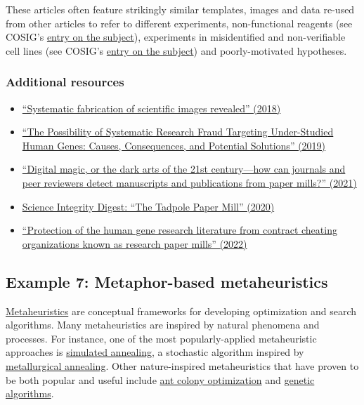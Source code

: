 \documentclass[letterpaper, 12pt]{article}
\begin{document}
These articles often feature strikingly similar templates, images and data re-used from other articles to refer to different experiments, non-functional reagents (see COSIG's \href{https://osf.io/2egvz}{entry on the subject}), experiments in misidentified and non-verifiable cell lines (see COSIG's \href{https://osf.io/d7we5}{entry on the subject}) and poorly-motivated hypotheses.

\subsubsection*{Additional resources}

\begin{itemize}
    \setlength\itemsep{-0.5em}
    \item \href{https://doi.org/10.1002/1873-3468.13201}{``Systematic fabrication of scientific images revealed'' (2018)}
    \item \href{https://doi.org/10.1177/1177271919829162}{``The Possibility of Systematic Research Fraud Targeting Under-Studied Human Genes: Causes, Consequences, and Potential Solutions'' (2019)}
    \item \href{https://doi.org/10.1002/1873-3468.13747}{``Digital magic, or the dark arts of the 21st century—how can journals and peer reviewers detect manuscripts and publications from paper mills?'' (2021)}
    \item \href{https://scienceintegritydigest.com/2020/02/21/the-tadpole-paper-mill/}{Science Integrity Digest: ``The Tadpole Paper Mill'' (2020)}
    \item \href{https://doi.org/10.1093/nar/gkac1139}{``Protection of the human gene research literature from contract cheating organizations known as research paper mills'' (2022)}

\end{itemize}

\subsection*{Example 7: Metaphor-based metaheuristics}

\href{https://en.wikipedia.org/wiki/Metaheuristic}{Metaheuristics} are conceptual frameworks for developing optimization and search algorithms. Many metaheuristics are inspired by natural phenomena and processes. For instance, one of the most popularly-applied metaheuristic approaches is \href{https://en.wikipedia.org/wiki/Simulated_annealing}{simulated annealing}, a stochastic algorithm inspired by \href{https://en.wikipedia.org/wiki/Annealing_(materials_science)}{metallurgical annealing}. Other nature-inspired metaheuristics that have proven to be both popular and useful include \href{https://en.wikipedia.org/wiki/Ant_colony_optimization_algorithms}{ant colony optimization} and \href{https://en.wikipedia.org/wiki/Genetic_algorithm}{genetic algorithms}.
\end{document}
